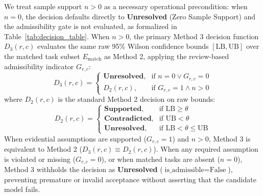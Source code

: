 \documentclass[runningheads]{llncs}
\begin{document}
We treat sample support $n > 0$ as a necessary operational precondition: when $n = 0$, the decision defaults directly to \textbf{Unresolved} (Zero Sample Support) and the admissibility gate is not evaluated, as formalized in Table~\ref{tab:decision_table}. When $n > 0$, the primary Method 3 decision function $D_3(r, c)$ evaluates the same raw 95\% Wilson confidence bounds $[\text{LB}, \text{UB}]$ over the matched task subset $E_{\text{match}}$ as Method 2, applying the review-based admissibility indicator $G_{r,c}$:
\begin{equation}
\label{eq:decision_function}
D_3(r, c) = \begin{cases}
\textbf{Unresolved}, & \text{if } n = 0 \lor G_{r,c} = 0 \\
D_2(r, c), & \text{if } G_{r,c} = 1 \land n > 0
\end{cases}
\end{equation}
where $D_2(r, c)$ is the standard Method 2 decision on raw bounds:
\begin{equation}
\label{eq:m2_function}
D_2(r, c) = \begin{cases}
\textbf{Supported}, & \text{if } \text{LB} \ge \theta \\
\textbf{Contradicted}, & \text{if } \text{UB} < \theta \\
\textbf{Unresolved}, & \text{if } \text{LB} < \theta \le \text{UB}
\end{cases}
\end{equation}
When evidential assumptions are supported ($G_{r,c} = 1$) and $n > 0$, Method 3 is equivalent to Method 2 ($D_3(r, c) \equiv D_2(r, c)$). When any required assumption is violated or missing ($G_{r,c} = 0$), or when matched tasks are absent ($n = 0$), Method 3 withholds the decision as \textbf{Unresolved} ($\text{is\_admissible} = \text{False}$), preventing premature or invalid acceptance without asserting that the candidate model fails.
\end{document}
